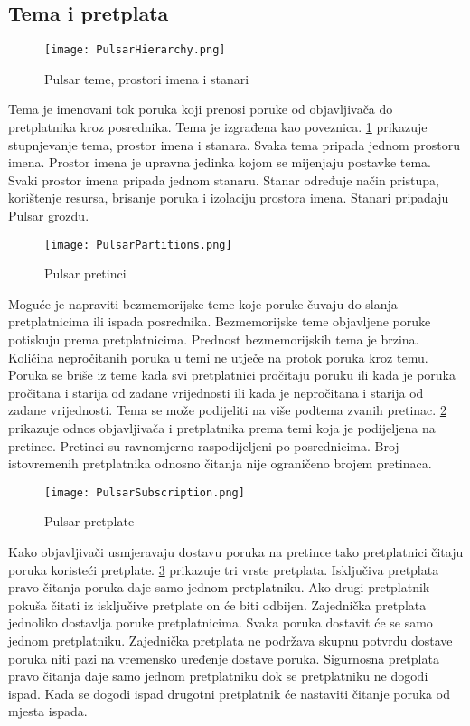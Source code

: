 \documentclass[times, utf8, diplomski, numeric]{fer}
\begin{document}
\subsection{Tema i pretplata}

\begin{figure}[H]
    \centering
    \texttt{[image: PulsarHierarchy.png]}
    \caption{Pulsar teme, prostori imena i stanari}
    \label{fig:pulsar-hierarchy}
\end{figure}

Tema je imenovani tok poruka koji prenosi poruke od objavljivača do pretplatnika kroz posrednika. Tema je izgrađena kao poveznica. \ref{fig:pulsar-hierarchy} prikazuje stupnjevanje tema, prostor imena i stanara. Svaka tema pripada jednom prostoru imena. Prostor imena je upravna jedinka kojom se mijenjaju postavke tema. Svaki prostor imena pripada jednom stanaru. Stanar određuje način pristupa, korištenje resursa, brisanje poruka i izolaciju prostora imena. Stanari pripadaju Pulsar grozdu.

\begin{figure}[H]
    \centering
    \texttt{[image: PulsarPartitions.png]}
    \caption{Pulsar pretinci}
    \label{fig:pulsar-partitions}
\end{figure}

Moguće je napraviti bezmemorijske teme koje poruke čuvaju do slanja pretplatnicima ili ispada posrednika. Bezmemorijske teme objavljene poruke potiskuju prema pretplatnicima. Prednost bezmemorijskih tema je brzina. Količina nepročitanih poruka u temi ne utječe na protok poruka kroz temu. Poruka se briše iz teme kada svi pretplatnici pročitaju poruku ili kada je poruka pročitana i starija od zadane vrijednosti ili kada je nepročitana i starija od zadane vrijednosti. Tema se može podijeliti na više podtema zvanih pretinac. \ref{fig:pulsar-partitions} prikazuje odnos objavljivača i pretplatnika prema temi koja je podijeljena na pretince. Pretinci su ravnomjerno raspodijeljeni po posrednicima. Broj istovremenih pretplatnika odnosno čitanja nije ograničeno brojem pretinaca.

\begin{figure}[H]
    \centering
    \texttt{[image: PulsarSubscription.png]}
    \caption{Pulsar pretplate}
    \label{fig:pulsar-subscription}
\end{figure}

Kako objavljivači usmjeravaju dostavu poruka na pretince tako pretplatnici čitaju poruka koristeći pretplate. \ref{fig:pulsar-subscription} prikazuje tri vrste pretplata. Isključiva pretplata pravo čitanja poruka daje samo jednom pretplatniku. Ako drugi pretplatnik pokuša čitati iz isključive pretplate on će biti odbijen. Zajednička pretplata jednoliko dostavlja poruke pretplatnicima. Svaka poruka dostavit će se samo jednom pretplatniku. Zajednička pretplata ne podržava skupnu potvrdu dostave poruka niti pazi na vremensko uređenje dostave poruka. Sigurnosna pretplata pravo čitanja daje samo jednom pretplatniku dok se pretplatniku ne dogodi ispad. Kada se dogodi ispad drugotni pretplatnik će nastaviti čitanje poruka od mjesta ispada.
\end{document}
